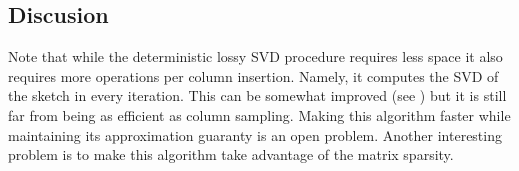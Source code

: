 \documentclass{article}
\begin{document}
\subsection*{Discusion}
Note that while the deterministic lossy SVD procedure requires less space it also requires more operations per column insertion.
Namely, it computes the SVD of the sketch in every iteration. 
This can be somewhat improved (see \cite{LibertyMatrixSketching2012}) but it is still far from being as efficient as column sampling.
Making this algorithm faster while maintaining its approximation guaranty is an open problem.
Another interesting problem is to make this algorithm take advantage of the matrix sparsity.






\end{document}
